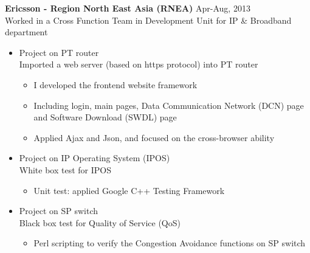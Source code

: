 \documentclass[line,margin]{res}
\begin{document}
\begin{resume}
\renewcommand{\labelitemi}{$\bullet$}
\renewcommand{\labelitemii}{-}

{\bf Ericsson - Region North East Asia (RNEA)}
\hfill{\textcolor[rgb]{0.7,0.7,0.7}{Apr-Aug, 2013}}\\
Worked in a Cross Function Team in Development Unit for IP \& Broadband department

\begin{itemize}
\itemsep -2pt %

    \item Project on PT router\\
    Imported a web server (based on https protocol) into PT router\vspace{-6pt}
    \begin{itemize} \itemsep -2pt
        \item I developed the frontend website framework
        \item Including login, main pages, Data Communication Network (DCN) page and Software Download (SWDL) page
        \item Applied Ajax and Json, and focused on the cross-browser ability
    \end{itemize}
    
    \item Project on IP Operating System (IPOS)\\
    White box test for IPOS\vspace{-6pt}
    \begin{itemize}\itemsep -2pt %
        \item Unit test: applied Google C++ Testing Framework
    \end{itemize}
    
    \item Project on SP switch\\
    Black box test for Quality of Service (QoS)\vspace{-6pt}
    \begin{itemize}\itemsep -2pt %
        \item Perl scripting to verify the Congestion Avoidance functions on SP switch
    \end{itemize}

\end{itemize}


\end{resume}
\end{document}
